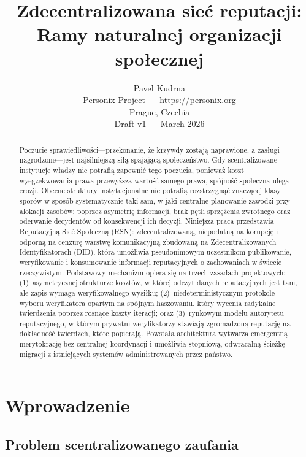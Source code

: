 \documentclass[11pt,a4paper,twocolumn]{article}
\title{\textbf{Zdecentralizowana sieć reputacji:\\Ramy naturalnej organizacji społecznej}}
\author{Pavel Kudrna\\Personix Project --- \url{https://personix.org}\\Prague, Czechia\\Draft v1 --- March 2026}
\date{}
\begin{document}
\maketitle

\begin{abstract}
Poczucie sprawiedliwości---przekonanie, że krzywdy zostają naprawione, a zasługi nagrodzone---jest najsilniejszą siłą spajającą społeczeństwo. Gdy scentralizowane instytucje władzy nie potrafią zapewnić tego poczucia, ponieważ koszt wyegzekwowania prawa przewyższa wartość samego prawa, spójność społeczna ulega erozji. Obecne struktury instytucjonalne nie potrafią rozstrzygnąć znaczącej klasy sporów w sposób systematycznie taki sam, w jaki centralne planowanie zawodzi przy alokacji zasobów: poprzez asymetrię informacji, brak pętli sprzężenia zwrotnego oraz oderwanie decydentów od konsekwencji ich decyzji. Niniejsza praca przedstawia Reputacyjną Sieć Społeczną (RSN): zdecentralizowaną, niepodatną na korupcję i odporną na cenzurę warstwę komunikacyjną zbudowaną na Zdecentralizowanych Identyfikatorach (DID), która umożliwia pseudonimowym uczestnikom publikowanie, weryfikowanie i konsumowanie informacji reputacyjnych o zachowaniach w świecie rzeczywistym. Podstawowy mechanizm opiera się na trzech zasadach projektowych: (1)~asymetrycznej strukturze kosztów, w której odczyt danych reputacyjnych jest tani, ale zapis wymaga weryfikowalnego wysiłku; (2)~niedeterministycznym protokole wyboru weryfikatora opartym na spójnym haszowaniu, który wycenia radykalne twierdzenia poprzez rosnące koszty iteracji; oraz (3)~rynkowym modelu autorytetu reputacyjnego, w którym prywatni weryfikatorzy stawiają zgromadzoną reputację na dokładność twierdzeń, które popierają. Powstała architektura wytwarza emergentną merytokrację bez centralnej koordynacji i umożliwia stopniową, odwracalną ścieżkę migracji z istniejących systemów administrowanych przez państwo.
\end{abstract}

\section{Wprowadzenie}

\subsection{Problem scentralizowanego zaufania}
\end{document}
